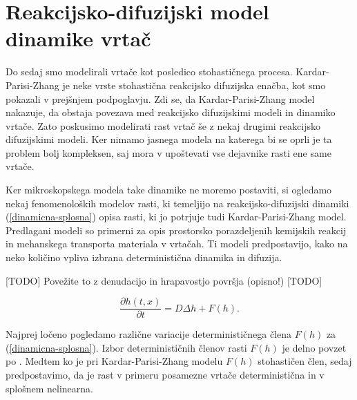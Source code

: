 \documentclass[a4paper, twoside, 12pt]{book}
\begin{document}
\newpage
\section{Reakcijsko-difuzijski model dinamike vrtač}

Do sedaj smo modelirali vrtače kot posledico stohastičnega procesa. Kardar-Parisi-Zhang je neke vrste stohastična reakcijsko difuzijska enačba, kot smo pokazali v prejšnjem podpoglavju. Zdi se, da Kardar-Parisi-Zhang model nakazuje, da obstaja povezava med reakcijsko difuzijskimi modeli in dinamiko vrtače. Zato poskusimo modelirati rast vrtač še z nekaj drugimi reakcijsko difuzijskimi modeli. Ker nimamo jasnega modela na katerega bi se oprli je ta problem bolj kompleksen, saj mora v upoštevati vse dejavnike rasti ene same vrtače. 

Ker mikroskopskega modela take dinamike ne moremo postaviti, si ogledamo nekaj fenomenoloških modelov rasti, ki temeljijo na reakcijsko-difuzijski dinamiki (\ref{dinamicna-splosna}) opisa rasti, ki jo potrjuje tudi Kardar-Parisi-Zhang model. Predlagani modeli so primerni za opis prostorsko porazdeljenih kemijskih reakcij in mehanskega transporta materiala v vrtačah. Ti modeli predpostavijo, kako na neko količino vpliva izbrana deterministična dinamika in difuzija.

[TODO] Povežite to z denudacijo in hrapavostjo površja (opisno!) [TODO]

\begin{equation}
  \frac{ \partial h(t,x) }{ \partial t} = D \Delta h + F(h).
  \label{dinamicna-splosna}
\end{equation}

Najprej ločeno pogledamo različne variacije determinističnega člena $F(h)$ za (\ref{dinamicna-splosna}). Izbor determinističnih členov rasti $F(h)$ je delno povzet po \cite{kandler2010population}. Medtem ko je pri Kardar-Parisi-Zhang modelu $F(h)$ stohastičen člen, sedaj predpostavimo, da je rast v primeru posamezne vrtače deterministična in v splošnem nelinearna.

\end{document}
